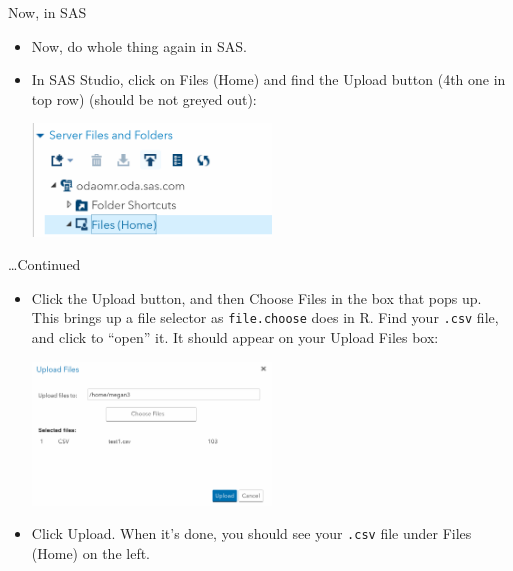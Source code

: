 \documentclass[unknownkeysallowed]{beamer}\usepackage[]{graphicx}\usepackage[]{color}
\begin{document}
\begin{frame}[fragile]{Now, in SAS}
  
  \begin{itemize}
  \item Now, do whole thing again in SAS.
  \item In SAS Studio, click on Files (Home) and find the Upload
    button (4th one in top row) (should be not greyed out):
    
\includegraphics[width=0.5\textwidth]{upload}

  \end{itemize}
  
\end{frame}

\begin{frame}[fragile]{\ldots Continued}
  
  \begin{itemize}
\item Click the Upload button, and then Choose Files in the box that
  pops up. This brings up a file selector as \texttt{file.choose} does
  in R. Find your \texttt{.csv} file, and click to ``open'' it. It
  should appear on your Upload Files box:
  
\includegraphics[width=0.5\textwidth]{upload-file}

\item Click Upload. When it's done, you should see your \texttt{.csv}
  file under Files (Home) on the left.
  \end{itemize}
  
\end{frame}
\end{document}
